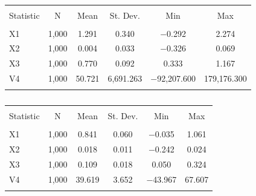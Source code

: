 \documentclass[]{article}
\begin{document}
\begin{table}[!htbp] \centering 
  \caption{} 
  \label{} 
\begin{tabular}{@{\extracolsep{5pt}}lccccc} 
\\[-1.8ex]\hline 
\hline \\[-1.8ex] 
Statistic & \multicolumn{1}{c}{N} & \multicolumn{1}{c}{Mean} & \multicolumn{1}{c}{St. Dev.} & \multicolumn{1}{c}{Min} & \multicolumn{1}{c}{Max} \\ 
\hline \\[-1.8ex] 
X1 & 1,000 & 1.291 & 0.340 & $-$0.292 & 2.274 \\ 
X2 & 1,000 & 0.004 & 0.033 & $-$0.326 & 0.069 \\ 
X3 & 1,000 & 0.770 & 0.092 & 0.333 & 1.167 \\ 
V4 & 1,000 & 50.721 & 6,691.263 & $-$92,207.600 & 179,176.300 \\ 
\hline \\[-1.8ex] 
\end{tabular} 
\end{table} 


\newpage

\begin{table}[!htbp] \centering 
  \caption{} 
  \label{} 
\begin{tabular}{@{\extracolsep{5pt}}lccccc} 
\\[-1.8ex]\hline 
\hline \\[-1.8ex] 
Statistic & \multicolumn{1}{c}{N} & \multicolumn{1}{c}{Mean} & \multicolumn{1}{c}{St. Dev.} & \multicolumn{1}{c}{Min} & \multicolumn{1}{c}{Max} \\ 
\hline \\[-1.8ex] 
X1 & 1,000 & 0.841 & 0.060 & $-$0.035 & 1.061 \\ 
X2 & 1,000 & 0.018 & 0.011 & $-$0.242 & 0.024 \\ 
X3 & 1,000 & 0.109 & 0.018 & 0.050 & 0.324 \\ 
V4 & 1,000 & 39.619 & 3.652 & $-$43.967 & 67.607 \\ 
\hline \\[-1.8ex] 
\end{tabular} 
\end{table} 
\end{document}

